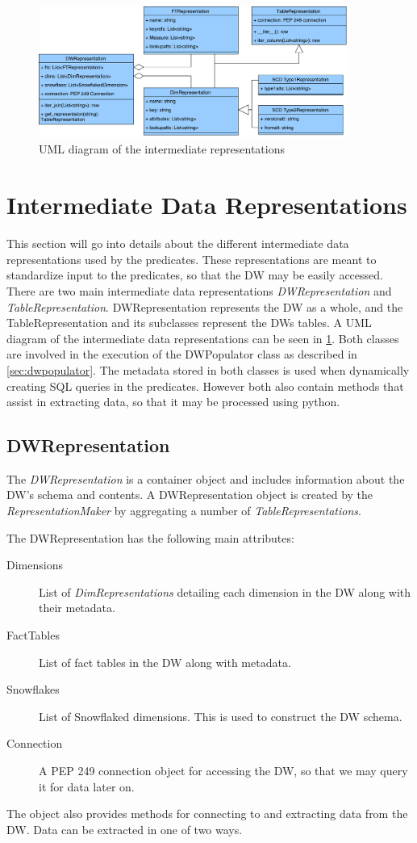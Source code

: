 \begin{figure}
\centering
\includegraphics[width=0.9\textwidth]{figures/dwrep_uml.pdf}
\caption{UML diagram of the intermediate representations}
\label{fig:dwrep}
\end{figure}

\section{Intermediate Data Representations}\label{sect:interdatarep}

This section will go into details about the different intermediate data representations used by the predicates. These representations are meant to standardize input to the predicates, so that the DW may be easily accessed. There are two main intermediate data representations \textit{DWRepresentation} and \textit{TableRepresentation}. DWRepresentation represents the DW as a whole, and the TableRepresentation and its subclasses represent the DWs tables. A UML diagram of the intermediate data representations can be seen in \cref{fig:dwrep}. Both classes are involved in the execution of the DWPopulator class as described in \cref{sec:dwpopulator}. The metadata stored in both classes is used when dynamically creating SQL queries in the predicates. However both also contain methods that assist in extracting data, so that it may be processed using python. 

\subsection{DWRepresentation}
The \textit{DWRepresentation} is a container object and includes information about the DW's schema and contents. A DWRepresentation object is created by the \textit{RepresentationMaker} by aggregating a number of \textit{TableRepresentations}.

The DWRepresentation has the following main attributes:

\begin{description}
\item[Dimensions] List of \textit{DimRepresentations} detailing each dimension in the DW along with their metadata.
\item[FactTables] List of fact tables in the DW along with metadata.
\item[Snowflakes] List of Snowflaked dimensions. This is used to construct the DW schema.
\item[Connection] A PEP 249 connection object for accessing the DW, so that we may query it for data later on.
\end{description}
The object also provides methods for connecting to and extracting data from the DW. Data can be extracted in one of two ways.

